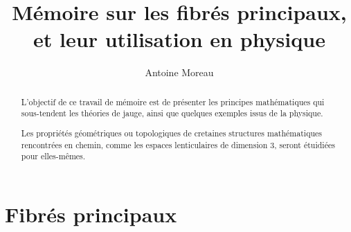 \documentclass[a4paper,10pt]{report}
\title{M\'emoire sur les fibr\'es principaux, et leur utilisation en physique}
\author{Antoine Moreau}
\begin{document}
\maketitle

\begin{abstract}
L'objectif de ce travail de m\'emoire est de pr\'esenter les principes math\'ematiques qui sous-tendent les th\'eories de jauge, %
ainsi que quelques exemples issus de la physique.

\par
Les propri\'et\'es g\'eom\'etriques ou topologiques de cretaines structures math\'ematiques rencontr\'ees en chemin, %
comme les espaces lenticulaires de dimension $3$, seront \'etuidi\'ees pour elles-m\^emes.
\end{abstract}

\chapter{Fibr\'es principaux}





\appendix

%



\end{document}
